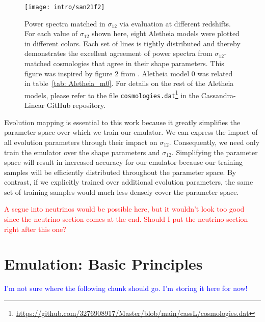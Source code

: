 \begin{figure}[htb]
  \centering
  \texttt{[image: intro/san21f2]}
  \cprotect\caption[Demonstration of evolution mapping]{Power spectra matched
  	in $\sigma_{12}$ via evaluation at different redshifts. For each value of
  	$\sigma_{12}$
  	shown here, eight Aletheia models were plotted in different
  	colors. Each set of lines is tightly distributed and thereby demonstrates 
  	the excellent agreement of power spectra from $\sigma_{12}$-matched
  	cosmologies that agree in their shape parameters. This figure was
  	inspired by figure 2 from \citet{San21}. Aletheia model 0 was related in
  	table~\ref{tab: Aletheia_m0}. For details on the rest of the Aletheia
  	models, please refer to the file
  	\verb|cosmologies.dat|\footnote{\url{https://github.com/3276908917/Master/blob/main/cassL/cosmologies.dat}}
  	in the Cassandra-Linear GitHub repository.}
  \label{fig: ev_mapping_demo}
\end{figure}


Evolution mapping is essential to this work because it greatly simplifies the 
parameter space over which we train our emulator. We can express the impact of
all evolution parameters through their impact on $\sigma_{12}$. Consequently, 
we need only train the emulator over the shape parameters and $\sigma_{12}$.
Simplifying the parameter space will
result in increased accuracy for our emulator because our training samples
will be efficiently distributed throughout the parameter space. By contrast,
if we explicitly trained over additional evolution parameters, the same set of
training samples would much less densely cover the parameter space.

\textcolor{red}{A segue into neutrinos would be possible here, but it
wouldn't look too good since the neutrino section comes at the end. Should I
put the neutrino section right after this one?}



\section{Emulation: Basic Principles}
\label{sec: emulation_intro}

\textcolor{blue}{I'm not sure where the following chunk should go. I'm storing
it here for now!}

